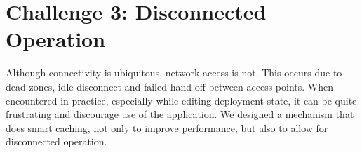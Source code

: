 






\section{Challenge 3: Disconnected Operation}
Although connectivity is ubiquitous, network access is not.  This occurs due to dead zones, 
idle-disconnect and failed hand-off between access points.  When encountered in practice, especially while editing
deployment state, it can be quite frustrating and discourage use of the application.  We designed a
mechanism that does smart caching, not only to improve performance, but also to allow for disconnected operation.





